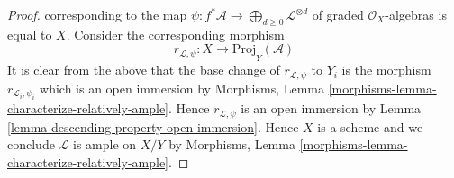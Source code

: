 \documentclass[10pt,a4paper]{amsart}
\theoremstyle{plain}
\theoremstyle{definition}
\theoremstyle{remark}
\numberwithin{equation}{subsection}
\begin{document}
\begin{proof}
corresponding to the map
$\psi : f^*\mathcal{A} \to \bigoplus_{d \geq 0} \mathcal{L}^{\otimes d}$
of graded $\mathcal{O}_X$-algebras
is equal to $X$. Consider the corresponding morphism
$$
r_{\mathcal{L}, \psi} : X \longrightarrow \underline{\text{Proj}}_Y(\mathcal{A})
$$
It is clear from the above that the base change of
$r_{\mathcal{L}, \psi}$ to $Y_i$ is the morphism
$r_{\mathcal{L}_i, \psi_i}$ which is an open immersion by
Morphisms, Lemma \ref{morphisms-lemma-characterize-relatively-ample}.
Hence $r_{\mathcal{L}, \psi}$ is an open immersion
by Lemma \ref{lemma-descending-property-open-immersion}.
Hence $X$ is a scheme
and we conclude $\mathcal{L}$ is ample on $X/Y$ by
Morphisms, Lemma \ref{morphisms-lemma-characterize-relatively-ample}.
\end{proof}
\end{document}

